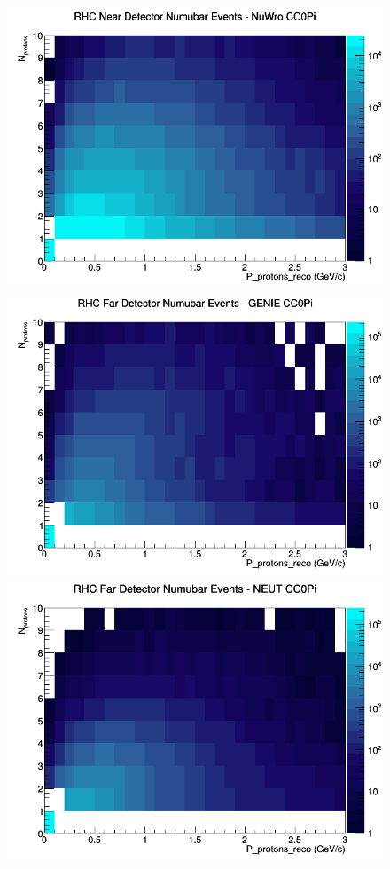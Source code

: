 \begin{figure}[h]
\includegraphics[width=\linewidth]{eff_N_P/GAr/protons/CC0Pi_RHC_ND_numubar_N_P_NuWro.png}
\endminipage
\newline
{}
\includegraphics[width=\linewidth]{eff_N_P/GAr/protons/CC0Pi_RHC_FD_numubar_N_P_GENIE.png}
\endminipage
{}
\includegraphics[width=\linewidth]{eff_N_P/GAr/protons/CC0Pi_RHC_FD_numubar_N_P_NEUT.png}

\end{figure}
